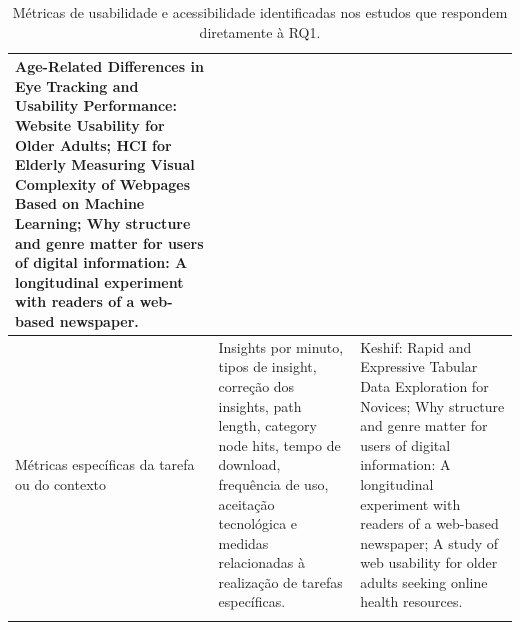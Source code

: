 \begin{longtable}{|p{3.5cm}|p{5.5cm}|p{6cm}|}
Age-Related Differences in Eye Tracking and Usability Performance: Website Usability for Older Adults; HCI for Elderly Measuring Visual Complexity of Webpages Based on Machine Learning; Why structure and genre matter for users of digital information: A longitudinal experiment with readers of a web-based newspaper. \\ \hline

Métricas específicas da tarefa ou do contexto &

Insights por minuto, tipos de insight, correção dos insights, path length, category node hits, tempo de download, frequência de uso, aceitação tecnológica e medidas relacionadas à realização de tarefas específicas. &

Keshif: Rapid and Expressive Tabular Data Exploration for Novices; Why structure and genre matter for users of digital information: A longitudinal experiment with readers of a web-based newspaper; A study of web usability for older adults seeking online health resources. \\ \hline

\caption{Métricas de usabilidade e acessibilidade identificadas nos estudos que respondem diretamente à RQ1.}

\label{tab:metricasRQ1}

\end{longtable}